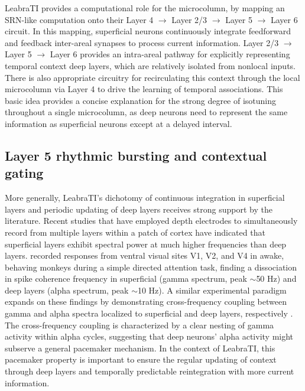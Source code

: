 \documentclass[dwyatte_dissertation.tex]{subfiles}
\begin{document}
LeabraTI provides a computational role for the microcolumn, by mapping an SRN-like computation onto their Layer 4 $\rightarrow$ Layer 2/3 $\rightarrow$ Layer 5 $\rightarrow$ Layer 6 circuit. In this mapping, superficial neurons continuously integrate feedforward and feedback inter-areal synapses to process current information. Layer 2/3 $\rightarrow$ Layer 5 $\rightarrow$ Layer 6 provides an intra-areal pathway for explicitly representing temporal context deep layers, which are relatively isolated from nonlocal inputs. There is also appropriate circuitry for recirculating this context through the local microcolumn via Layer 4 to drive the learning of temporal associations. This basic idea provides a concise explanation for the strong degree of isotuning throughout a single microcolumn, as deep neurons need to represent the same information as superficial neurons except at a delayed interval.

\subsection{Layer 5 rhythmic bursting and contextual gating}
More generally, LeabraTI's dichotomy of continuous integration in superficial layers and periodic updating of deep layers receives strong support by the literature. Recent studies that have employed depth electrodes to simultaneously record from multiple layers within a patch of cortex have indicated that superficial layers exhibit spectral power at much higher frequencies than deep layers.  recorded responses from ventral visual sites V1, V2, and V4 in awake, behaving monkeys during a simple directed attention task, finding a dissociation in spike coherence frequency in superficial (gamma spectrum, peak $\sim$50 Hz) and deep layers (alpha spectrum, peak $\sim$10 Hz). A similar experimental paradigm expands on these findings by demonstrating cross-frequency coupling between gamma and alpha spectra localized to superficial and deep layers, respectively \cite{SpaakBonnefondMaierEtAl12}. %
The cross-frequency coupling is characterized by a clear nesting of gamma activity within alpha cycles, suggesting that deep neurons' alpha activity might subserve a general pacemaker mechanism. In the context of LeabraTI, this pacemaker property is important to ensure the regular updating of context through deep layers and temporally predictable reintegration with more current information.
\end{document}
